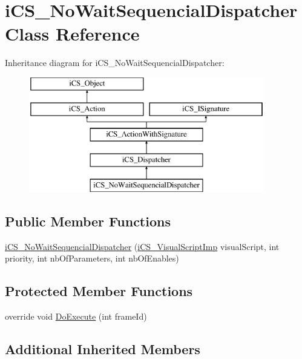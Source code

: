 \hypertarget{classi_c_s___no_wait_sequencial_dispatcher}{\section{i\+C\+S\+\_\+\+No\+Wait\+Sequencial\+Dispatcher Class Reference}
\label{classi_c_s___no_wait_sequencial_dispatcher}
}
Inheritance diagram for i\+C\+S\+\_\+\+No\+Wait\+Sequencial\+Dispatcher\+:\begin{figure}[H]
\begin{center}
\leavevmode
\includegraphics[height=5.000000cm]{classi_c_s___no_wait_sequencial_dispatcher}
\end{center}
\end{figure}
\subsection*{Public Member Functions}
\begin{DoxyCompactItemize}
\item 
\hyperlink{classi_c_s___no_wait_sequencial_dispatcher_a7c975861b63098a1108f271a2d5f8720}{i\+C\+S\+\_\+\+No\+Wait\+Sequencial\+Dispatcher} (\hyperlink{classi_c_s___visual_script_imp}{i\+C\+S\+\_\+\+Visual\+Script\+Imp} visual\+Script, int priority, int nb\+Of\+Parameters, int nb\+Of\+Enables)
\end{DoxyCompactItemize}
\subsection*{Protected Member Functions}
\begin{DoxyCompactItemize}
\item 
override void \hyperlink{classi_c_s___no_wait_sequencial_dispatcher_ac23e7d7fa0e5f47fe07b0bc3317e6a4c}{Do\+Execute} (int frame\+Id)
\end{DoxyCompactItemize}
\subsection*{Additional Inherited Members}


